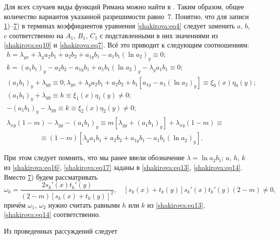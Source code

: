 Для всех случаев виды функций Римана можно найти в \cite{shakirova:6-ru, shakirova:15-ru, shakirova:16-ru}. 
Таким образом, общее количество вариантов указанной разрешимости равно~7. 
Понятно, что для записи \hyperlink{shakirova:t1}{1})--\hyperlink{shakirova:t7}{7}) в терминах коэффициентов уравнения \eqref{shakirova:eq4} следует заменить $a$, $b$, $c$ соответственно на $A_1$, $B_1$, $C_1$ с подставленными в них значениями из \eqref{shakirova:eq10} и \eqref{shakirova:eq7}. 
Всё это приводит к следующим соотношениям:
\begin{gather}
\label{shakirova:eq13}
h=\lambda_{yx}+\lambda_ya_2b_1+a_2b_2+a_{1y}b_1-a_1b_1(\ln a_2)_y\equiv 0;
\\
k=(a_1b_1)_y-a_2b_2-a_{1y}b_1+a_1b_1(\ln a_2)_y-\lambda_ya_1b_1\equiv 0;
\label{shakirova:eq14}
\\
\!\!\!\!\!(a_1b_1)_y+\lambda_{yy}\equiv 0,  \lambda_{yx}+\lambda_ya_2b_1+a_2b_2+b_1[a_{1y}-a_1(\ln a_2)_y]\equiv \xi_0(x)\eta_0(y);
\label{shakirova:eq15}
\\
(a_1b_1)_y+\lambda_{yy}\equiv h\equiv \xi_1(x)\eta_1(y)\neq 0;
\label{shakirova:eq16}
\\
-(a_1b_1)_y-\lambda_{yy}\equiv k\equiv \xi_2(x)\eta_2(y)\neq 0;
\label{shakirova:eq17}
\\
\lambda_{xy}(1-m)-\lambda_{yy}-(a_1b_1)_y\equiv m[\lambda_{yy}+(a_1b_1)_y]+\lambda_{xy}(1-m)\equiv 
\hspace{2cm}
\\
\hspace{2cm}
\equiv(1-m)[\lambda_ya_1b_1+a_2b_2+a_{1y}b_1-a_1b_1(\ln a_2)_y].
\label{shakirova:eq18}
\end{gather}

При этом следует помнить, что мы ранее ввели обозначение $\lambda=\ln a_2b_1$; 
$a$, $h$, $k$ из \eqref{shakirova:eq16}, \eqref{shakirova:eq17} заданы в \eqref{shakirova:eq13}, \eqref{shakirova:eq14}.
Вместо \hyperlink{shakirova:t7}{7}) будем рассматривать
\begin{equation}
\omega_k=\frac{2s_k'(x)t_k'(y)}{(2-m)[s_k(x)+t_k(y)]^2}, \quad [s_k(x)+t_k(y)]s_k'(x)t_k'(y)(2-m)\neq 0,
\label{shakirova:eq19}
\end{equation}
причём $\omega_1$, $\omega_2$ нужно считать равными $h$ или $k$ из \eqref{shakirova:eq13}, \eqref{shakirova:eq14} соответственно.

Из проведенных рассуждений следует

